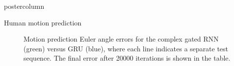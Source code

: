 \documentclass{beamer}
\begin{document}
\begin{frame}
\begin{columns}
\begin{column}{.57\textwidth}
\begin{beamercolorbox}[center]{postercolumn}
\begin{minipage}{.98\textwidth}
{\begin{myblock}{Human motion prediction}
\begin{figure}
                            \caption{Motion prediction Euler angle errors for the complex gated RNN (green) versus GRU (blue), where
                                     each line indicates a separate test sequence. The final error after 20000 iterations is shown in the table.}
                        \end{figure}
                    \end{myblock}\vfill
        }\end{minipage}\end{beamercolorbox}
    \end{column}
\end{columns}
\end{frame}
\end{document}
